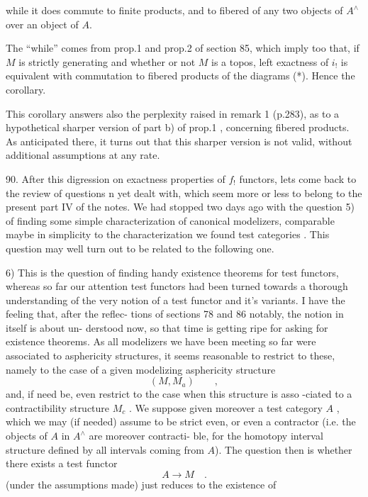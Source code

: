 
while it does commute to finite products, and to fibered  of
any two objects of $A^{\wedge}$ over an object of $A$.

The ``while'' comes from prop.1 and prop.2 of section 85, which
imply too that, if $M$ is strictly generating and whether or not $M$ is a
topos, left exactness of $i_{!}$ is equivalent with commutation to fibered
products of the diagrams (*). Hence the corollary.

This corollary answers also the perplexity raised in remark 1
(p.283), as to a hypothetical sharper version of part b) of prop.1 ,
concerning fibered products. As anticipated there, it turns out that
this sharper version is not valid,  without additional assumptions at
any rate.

90. After this digression on exactness properties of $f_{!}$ functors,
lets come back to the review of  questions n yet dealt with, which
seem more or less to belong to the present part IV of the notes. We
had stopped two days ago with the question 5) of finding some simple
characterization of canonical modelizers, comparable maybe in simplicity
to the characterization we found   test categories . This
question may well turn out to be related to the following one.

6) This is the question of finding handy existence theorems for
test functors, whereas so far our attention   test functors had
been turned towards a thorough understanding of the very notion of a test
functor and it's variants. I have the feeling that, after the reflec-%
tions of sections 78 and 86\unsure{,} notably, the notion in itself is about un-%
derstood now, so that time is getting ripe for asking for existence
theorems. As all modelizers we have been meeting so far were associated
to asphericity structures, it seems reasonable to restrict to these,
namely to the case of a given modelizing asphericity structure
\[ (M,M_{a}) \qquad , \]
and, if need be, even restrict to the case when this structure is asso
-ciated to a contractibility structure $M_{c}$ . We suppose given moreover
a test category $A$ , which we may (if needed) assume to be strict even,
or even a contractor (i.e. the objects of $A$ in $A^{\wedge}$ are moreover contracti-%
\margin{\{}ble, for the homotopy interval structure  defined by all intervals coming
from $A$). The question then is whether there exists a test functor
\[ A \longrightarrow M \quad . \]
  (under the assumptions made) just reduces to the existence of

